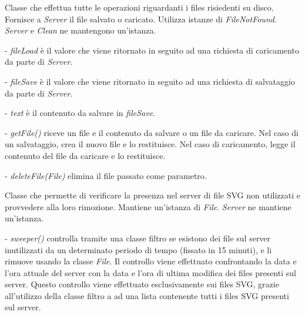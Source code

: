 Classe che effettua tutte le operazioni riguardanti i files risiedenti su disco. Fornisce a \textit{Server} il file salvato o caricato. 
Utilizza istanze di \textit{FileNotFound}.
\textit{Server} e \textit{Clean} ne mantengono un'istanza.
\begin{elencopuntato}[\subsubsecindent]
\item[-] \textit{fileLoad} \`e il valore che viene ritornato in seguito ad una richiesta di caricamento da parte di \textit{Server}.
\item[-] \textit{fileSave} \`e il valore che viene ritornato in seguito ad una richiesta di salvataggio da parte di \textit{Server}.
\item[-] \textit{text} \`e il contenuto da salvare in \textit{fileSave}.
\end{elencopuntato}
\begin{elencopuntato}[\subsubsecindent]
\item[-] \textit{getFile()} riceve un file e il contenuto da salvare o un file da caricare. Nel caso di un salvataggio, crea il nuovo file e lo restituisce. Nel caso di caricamento, legge il contenuto del file da caricare e lo restituisce.
\item[-] \textit{deleteFile(File)} elimina il file passato come parametro.
\end{elencopuntato}


Classe che permette di verificare la presenza nel server di file SVG non utilizzati e provvedere alla loro rimozione.
Mantiene un'istanza di \textit{File}.
\textit{Server} ne mantiene un'istanza.
\begin{elencopuntato}[\subsubsecindent]
\item[-] \textit{sweeper()} controlla tramite una classe filtro se esistono dei file sul server inutilizzati da un determinato periodo di tempo (fissato in 15 minuti), e li rimuove usando la classe \textit{File}. Il controllo viene effettuato confrontando la data e l'ora attuale del server con la data e l'ora di ultima modifica dei files presenti sul server. Questo controllo viene effettuato esclusivamente sui files SVG, grazie all'utilizzo della classe filtro a ad una lista contenente tutti i files SVG presenti sul server.
\end{elencopuntato}

